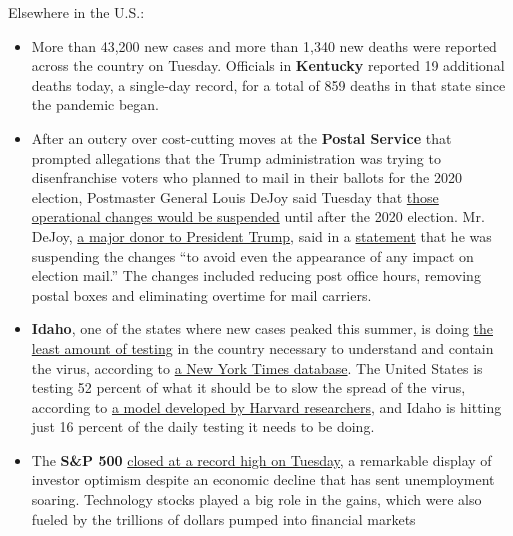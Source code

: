 Elsewhere in the U.S.:

\begin{itemize}
\item
  More than 43,200 new cases and more than 1,340 new deaths were
  reported across the country on Tuesday. Officials in \textbf{Kentucky}
  reported 19 additional deaths today, a single-day record, for a total
  of 859 deaths in that state since the pandemic began.
\item
  After an outcry over cost-cutting moves at the \textbf{Postal Service}
  that prompted allegations that the Trump administration was trying to
  disenfranchise voters who planned to mail in their ballots for the
  2020 election, Postmaster General Louis DeJoy said Tuesday that
  \href{https://www.nytimes3xbfgragh.onion/2020/08/18/us/politics/postal-service-suspends-changes.html}{those
  operational changes would be suspended} until after the 2020 election.
  Mr. DeJoy,
  \href{https://www.nytimes3xbfgragh.onion/2020/05/07/us/politics/postmaster-general-louis-dejoy.html}{a
  major donor to President Trump}, said in a
  \href{https://about.usps.com/newsroom/national-releases/2020/0818-postmaster-general-louis-dejoy-statement.htm}{statement}
  that he was suspending the changes ``to avoid even the appearance of
  any impact on election mail.'' The changes included reducing post
  office hours, removing postal boxes and eliminating overtime for mail
  carriers.
\item
  \textbf{Idaho}, one of the states where new cases peaked this summer,
  is doing
  \href{https://www.nytimes3xbfgragh.onion/interactive/2020/us/coronavirus-testing.html}{the
  least amount of testing} in the country necessary to understand and
  contain the virus, according to
  \href{https://www.nytimes3xbfgragh.onion/interactive/2020/us/coronavirus-testing.html}{a
  New York Times database}. The United States is testing 52 percent of
  what it should be to slow the spread of the virus, according to
  \href{https://globalepidemics.org/july-6-2020-state-testing-targets/}{a
  model developed by Harvard researchers}, and Idaho is hitting just 16
  percent of the daily testing it needs to be doing.
\item
  The \textbf{S\&P 500}
  \href{https://www.nytimes3xbfgragh.onion/live/2020/08/18/business/stock-market-today-coronavirus}{closed
  at a record high on Tuesday,} a remarkable display of investor
  optimism despite an economic decline that has sent unemployment
  soaring. Technology stocks played a big role in the gains, which were
  also fueled by the trillions of dollars pumped into financial markets

\end{itemize}
